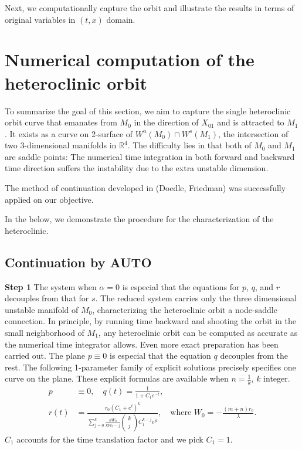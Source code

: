 \documentclass[a4paper,11pt]{article}
\theoremstyle{remark}
\begin{document}
Next, we computationally capture the orbit and illustrate the results in terms of original variables in $(t,x)$ domain.

\section{Numerical computation of the heteroclinic orbit} \label{sec:num_cont}
To summarize the goal of this section, we aim to capture the single heteroclinic orbit curve that emanates from $M_0$ in the direction of $X_{01}$ and is attracted to $M_1$. It exists as a curve on 2-surface of $W^u(M_0)\cap W^s(M_1)$, the intersection of two 3-dimensional manifolds in $\mathbb{R}^4$. The difficulty lies in that both of $M_0$ and $M_1$ are saddle points: The numerical time integration in both forward and backward time direction suffers the instability due to the extra unstable dimension.

The method of continuation developed in {(Doedle, Friedman)} was successfully applied on our objective.

In the below, we demonstrate the procedure for the characterization of the heteroclinic.
\subsection{Continuation by AUTO}
{\bf \noindent Step 1}
The system when $\alpha=0$ is especial that the equations for $p$, $q$, and $r$ decouples from that for $s$. The reduced system carries only the three dimensional unstable manifold of $M_0$, characterizing the heteroclinic orbit a node-saddle connection. In principle, by running time backward and shooting the orbit in the small neighborhood of $M_1$, any heteroclinic orbit can be computed as accurate as the numerical time integrator allows. Even more exact preparation has been carried out. The plane $p\equiv0$ is especial that the equation $q$ decouples from the rest. The following 1-parameter family of explicit solutions precisely specifies one curve on the plane. These explicit formulas are available when $n= \frac{1}{k}$, $k$ integer.
\begin{align}
 p&\equiv0, \quad q(t) = \frac{1}{1+C_1e^{-t}},\\
 r(t) &= \frac{r_0 \left(C_1 + e^t\right)^k}{ \displaystyle \sum_{j=0}^k \frac{kW_0}{kW_0 -j}\begin{pmatrix} k\\j\end{pmatrix}C_1^{k-j} e^{jt}} , \quad \text{where $W_0= - \frac{(m+n)r_0}{\lambda}$}.
\end{align}
$C_1$ accounts for the time translation factor and we pick $C_1=1$.
\end{document}
